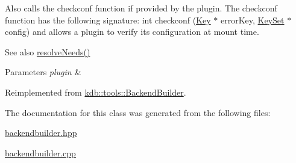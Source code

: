 Also calls the checkconf function if provided by the plugin. The checkconf function has the following signature\+: int checkconf (\hyperlink{classkdb_1_1Key}{Key} $\ast$ error\+Key, \hyperlink{classkdb_1_1KeySet}{Key\+Set} $\ast$ config) and allows a plugin to verify its configuration at mount time.

\begin{DoxySeeAlso}{See also}
\hyperlink{classkdb_1_1tools_1_1BackendBuilder_a6e6c23716dc72ef68f8acfd71fc802a9}{resolve\+Needs()} 
\end{DoxySeeAlso}

\begin{DoxyParams}{Parameters}
{\em plugin} & \\
\hline
\end{DoxyParams}


Reimplemented from \hyperlink{classkdb_1_1tools_1_1BackendBuilder_a987d2c3711399e24b42c38e652c0e1c4}{kdb\+::tools\+::\+Backend\+Builder}.



The documentation for this class was generated from the following files\+:\begin{DoxyCompactItemize}
\item 
\hyperlink{backendbuilder_8hpp}{backendbuilder.\+hpp}\item 
\hyperlink{backendbuilder_8cpp}{backendbuilder.\+cpp}\end{DoxyCompactItemize}
